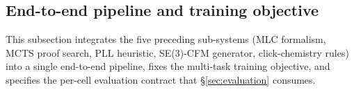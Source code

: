%
%

\makeatletter
\def\WFyu2020pcgradKey{yu2020pcgrad}
\def\WFschulman2017trpoKey{schulman2017trpo}
\def\WFlipman2023cfmKey{lipman2023cfm}
\def\WFuniMol2023Key{unimol2023}
\let\WForigCiteThreeSix\WForiginalCite
\def\WFcitePlainThreeSix#1{%
  \def\WFciteTempKeyThreeSix{#1}%
  \ifx\WFciteTempKeyThreeSix\WFyu2020pcgradKey Yu et al., 2020%
  \else\ifx\WFciteTempKeyThreeSix\WFschulman2017trpoKey Schulman et al., 2017%
  \else\ifx\WFciteTempKeyThreeSix\WFlipman2023cfmKey Lipman et al., 2023%
  \else\ifx\WFciteTempKeyThreeSix\WFuniMol2023Key Uni-Mol, 2023%
  \else \WForigCiteThreeSix{#1}%
  \fi\fi\fi\fi
}
\let\cite\WFcitePlainThreeSix
\makeatother

\subsection{End-to-end pipeline and training objective}
\label{sec:end-to-end}

This subsection integrates the five preceding sub-systems
(MLC formalism, MCTS proof search, PLL heuristic, SE(3)-CFM
generator, click-chemistry rules) into a single end-to-end
pipeline, fixes the multi-task training objective, and
specifies the per-cell evaluation contract that
\S\ref{sec:evaluation} consumes.

